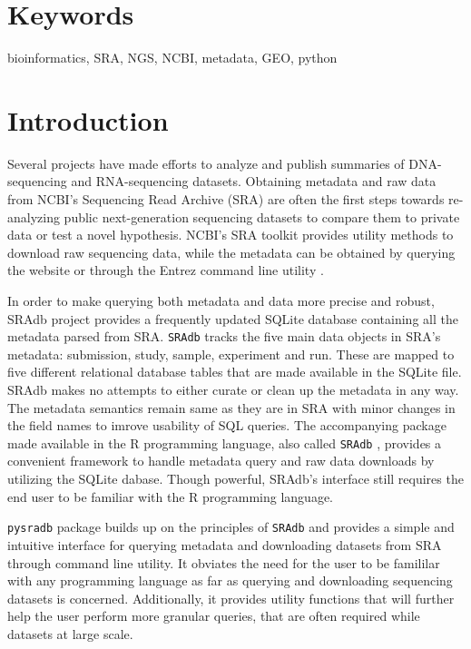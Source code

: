 \documentclass[9pt,a4paper]{extarticle}
\begin{document}
\section*{Keywords}
bioinformatics, SRA, NGS, NCBI, metadata, GEO, python



\clearpage
\pagestyle{main}
\section*{Introduction}
Several projects have made efforts to analyze and publish summaries of DNA-sequencing \cite{macarthur2012systematic} and RNA-sequencing \cite{lachmann2018massive, collado2017reproducible} datasets. Obtaining metadata and raw data from NCBI's Sequencing Read Archive (SRA)
\cite{leinonen2010sequence} are often the first steps towards re-analyzing public
next-generation sequencing datasets to compare them to private data or test a 
novel hypothesis. NCBI's SRA toolkit \cite{ncbisratoolit} provides utility methods
to download raw sequencing data, while the metadata can be obtained 
by querying the website or through the Entrez command line utility \cite{kans2018entrez}.


In order to make querying both metadata and data more precise and robust, SRAdb
\cite{zhu2013sradb} project provides a frequently updated SQLite database containing all the metadata parsed from SRA. \texttt{SRAdb} tracks the five main data objects in SRA's metadata: submission, study, sample, experiment and run. These are mapped to five different relational database tables that are made available in the SQLite file. SRAdb makes no attempts to either curate or clean up the metadata in any way. The metadata semantics remain same as they are in SRA with minor changes in the field names to imrove usability of SQL queries. The accompanying package made available in the R programming language, also called \texttt{SRAdb} \cite{zhudavissradb},
provides a convenient framework to handle metadata query and raw data downloads by 
utilizing the SQLite dabase. Though powerful, SRAdb's interface still requires the end user to be familiar with the R programming language. 


\texttt{pysradb} package builds up on the principles of \texttt{SRAdb} and 
provides a simple and intuitive interface for querying metadata and downloading
datasets from SRA through command line utility. It obviates the need for the
user to be famililar with any programming language as far as querying and downloading sequencing datasets is concerned. Additionally, it provides utility functions that will further help the user perform more granular queries, that
are often required while datasets at large scale.
\end{document}
